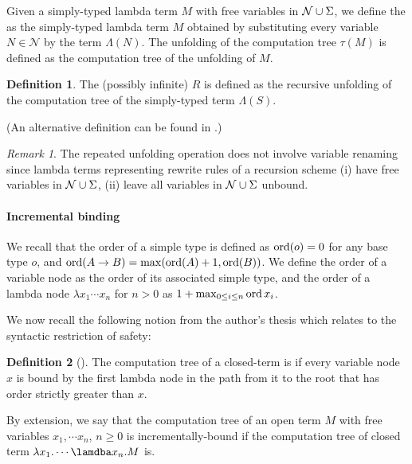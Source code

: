 \documentclass[a4paper,draft]{article}[12pt]
\theoremstyle{remark}
\newtheorem{remark}{Remark}[section]
\theoremstyle{definition}
\newtheorem{definition}{Definition}[section]
\begin{document}
Given a simply-typed lambda term $M$ with free variables in $\mathcal{N} \cup \Sigma$, we define the  as the simply-typed lambda term $M$ obtained by substituting every variable $N \in \mathcal{N}$ by the term $\Lambda (N)$. The unfolding of the computation tree $\tau(M)$ is defined as the computation tree of the unfolding of $M$. 

\begin{definition}
The (possibly infinite)  $R$ is defined as the recursive unfolding 
of the computation tree of the simply-typed term $\Lambda(S)$. 

(An alternative definition can be found in \cite{OngLics2006}.)
\end{definition}
\begin{remark} The repeated unfolding operation does not involve variable renaming since lambda terms representing rewrite rules of a recursion scheme (i) have free variables in $\mathcal{N} \cup \Sigma$, (ii) leave all variables in $\mathcal{N} \cup \Sigma$ unbound.
\end{remark}

\paragraph{Incremental binding}
We recall that the order of a simple type is defined as $\mathop{\mathrm{ord}}(o) = 0$ for any base type $o$, and $\mathop{\mathrm{ord}}(A \rightarrow B) = \max(\mathop{\mathrm{ord}}(A)+1, \mathop{\mathrm{ord}}(B))$. We define the order of a variable node as the order of its associated simple type, and the order of a lambda node $\lambda x_1 \cdots x_n$ for $n>0$ as $1 + \max_{0\leq i\leq n} \mathop{\mathrm{ord}}{x_i}$.

We now recall the following notion from the author's thesis \cite{BlumPhd,blumong:safelambdacalculus} which relates to the syntactic restriction of safety:
\begin{definition}[\cite{BlumPhd,blumong:safelambdacalculus}]
The computation tree of a closed-term is  if every variable node $x$ is bound by the first lambda node in the path from it to the root that has order strictly greater than $x$.

By extension, we say that the computation tree of an open term $M$ with free variables $x_1, \cdots x_n$, $n\geq 0$ is incrementally-bound if the computation tree of closed term $\lambda x_1 . \cdots \lamdba x_n . M$ is.
\end{definition} 
\end{document}
